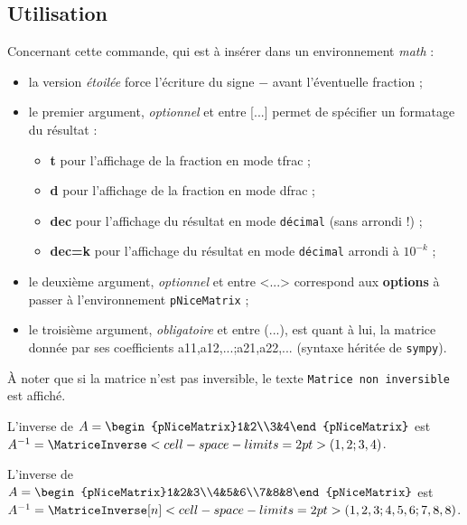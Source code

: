 \documentclass[a4paper,11pt]{article}
\newcommand\Cle[1]{{\bfseries\sffamily\textlangle #1\textrangle}}
\begin{document}
\subsection{Utilisation}

Concernant cette commande, qui est à insérer dans un environnement \textit{math} :

\begin{itemize}
	\item la version \textit{étoilée} force l'écriture du signe \og $-$ \fg{} avant l'éventuelle fraction ;
	\item le premier argument, \textit{optionnel} et entre \textsf{[...]} permet de spécifier un formatage du résultat :
	\begin{itemize}
		\item \Cle{t} pour l'affichage de la fraction en mode \textsf{tfrac} ;
		\item \Cle{d} pour l'affichage de la fraction en mode \textsf{dfrac} ;
		\item \Cle{dec} pour l'affichage du résultat en mode \texttt{décimal} (sans arrondi !) ;
		\item \Cle{dec=k} pour l'affichage du résultat en mode \texttt{décimal} arrondi à $10^{-k}$ ;
	\end{itemize}
	\item le deuxième argument, \textit{optionnel} et entre \textsf{<...>} correspond aux \Cle{options} à passer à l'environnement \texttt{pNiceMatrix} ;
	\item le troisième argument, \textit{obligatoire} et entre \textsf{(...)}, est quant à lui, la matrice donnée par ses coefficients \textsf{a11,a12,...;a21,a22,...} (syntaxe héritée de \texttt{sympy}).
\end{itemize}

À noter que si la matrice n'est pas inversible, le texte \texttt{Matrice non inversible} est affiché.

\begin{PresentationCode}{}
L'inverse de $A=\begin{pNiceMatrix}1&2\\3&4\end{pNiceMatrix}$ est
$A^{-1}=\MatriceInverse<cell-space-limits=2pt>(1,2;3,4)$.
\end{PresentationCode}

\begin{PresentationCode}{}
L'inverse de $A=\begin{pNiceMatrix}1&2&3\\4&5&6\\7&8&8\end{pNiceMatrix}$ est
$A^{-1}=\MatriceInverse[n]<cell-space-limits=2pt>(1,2,3;4,5,6;7,8,8)$.
\end{PresentationCode}
\end{document}
